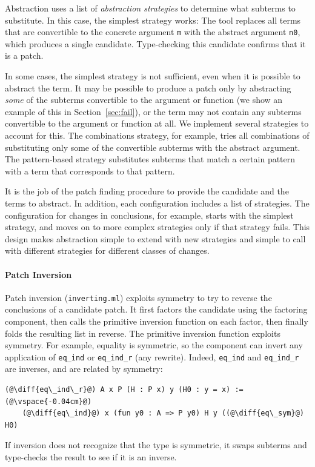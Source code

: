 Abstraction uses a list of \textit{abstraction strategies} to determine what subterms
to substitute. In this case, the simplest strategy works: The tool
replaces all terms that are convertible to the concrete argument \lstinline{m} with the abstract argument
\lstinline{n0}, which produces a single candidate. Type-checking this candidate confirms that it is a patch.

In some cases, the simplest strategy is not sufficient, even when it is possible to abstract the term.
It may be possible to produce a patch only by abstracting \emph{some} of the subterms
convertible to the argument or function (we show an example of this in Section~\ref{sec:fail}),
or the term may not contain any subterms convertible to the argument or function at all.
We implement several strategies to account for this. The combinations strategy, for example,
tries all combinations of substituting only some of the convertible subterms with the abstract argument. 
The pattern-based strategy substitutes subterms that match a certain pattern
with a term that corresponds to that pattern.

It is the job of the patch finding procedure to provide the candidate and the terms to abstract.
In addition, each configuration includes a list of strategies.
The configuration for changes in conclusions, for example, starts with the simplest strategy,
and moves on to more complex strategies only if that strategy fails.
This design makes abstraction simple to extend with new strategies and simple to call with different strategies
for different classes of changes.

\paragraph{Patch Inversion} Patch inversion (\lstinline{inverting.ml}) exploits symmetry to try to reverse the conclusions of a 
candidate patch.
It first factors the candidate using the factoring component, then calls the primitive inversion
function on each factor, then finally folds the resulting list in reverse.
The primitive inversion function exploits symmetry. 
For example, equality is symmetric, so the component can invert any application of \lstinline{eq_ind} or \lstinline{eq_ind_r}
(any rewrite). Indeed, \lstinline{eq_ind} and \lstinline{eq_ind_r} are inverses, and are related by symmetry:

\begin{lstlisting}[language=coq]
  (@\diff{eq\_ind\_r}@) A x P (H : P x) y (H0 : y = x) :=(@\vspace{-0.04cm}@)
    (@\diff{eq\_ind}@) x (fun y0 : A => P y0) H y ((@\diff{eq\_sym}@) H0)	
\end{lstlisting}
If inversion does not recognize that the type is symmetric, it
swaps subterms and type-checks the result to see if it is an inverse.

